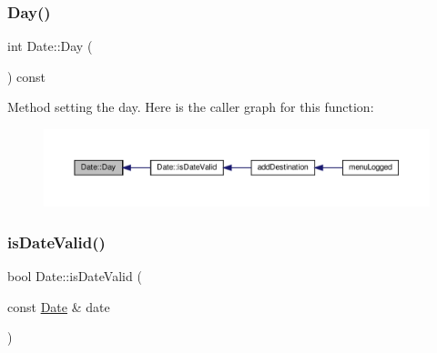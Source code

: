 \subsubsection{\texorpdfstring{Day()}{Day()}}
{\footnotesize\ttfamily int Date\+::\+Day (\begin{DoxyParamCaption}{ }\end{DoxyParamCaption}) const}

Method setting the day. Here is the caller graph for this function\+:\nopagebreak
\begin{figure}[H]
\begin{center}
\leavevmode
\includegraphics[width=350pt]{class_date_ad7f2e4e42aadc85322503dbef8484ad5_icgraph}
\end{center}
\end{figure}
\mbox{\label{class_date_a2d9a87adab3ae18acdb13e027ad1d0aa}} 
\subsubsection{\texorpdfstring{is\+Date\+Valid()}{isDateValid()}}
{\footnotesize\ttfamily bool Date\+::is\+Date\+Valid (\begin{DoxyParamCaption}\item[{const \hyperlink{class_date}{Date} \&}]{date }\end{DoxyParamCaption})}

